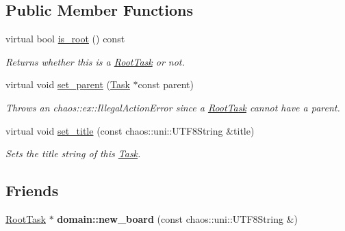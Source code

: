 \subsection*{Public Member Functions}
\begin{DoxyCompactItemize}
\item 
\hypertarget{classsigma_1_1core_1_1tasks_1_1_root_task_a121303d6c4380323fe54bc823ef11514}{}virtual bool \hyperlink{classsigma_1_1core_1_1tasks_1_1_root_task_a121303d6c4380323fe54bc823ef11514}{is\+\_\+root} () const \label{classsigma_1_1core_1_1tasks_1_1_root_task_a121303d6c4380323fe54bc823ef11514}

\begin{DoxyCompactList}\small\item\em Returns whether this is a \hyperlink{classsigma_1_1core_1_1tasks_1_1_root_task}{Root\+Task} or not. \end{DoxyCompactList}\item 
\hypertarget{classsigma_1_1core_1_1tasks_1_1_root_task_a4b9f9c86ba7a0e5b681479a444cd60b1}{}virtual void \hyperlink{classsigma_1_1core_1_1tasks_1_1_root_task_a4b9f9c86ba7a0e5b681479a444cd60b1}{set\+\_\+parent} (\hyperlink{classsigma_1_1core_1_1tasks_1_1_task}{Task} $\ast$const parent)\label{classsigma_1_1core_1_1tasks_1_1_root_task_a4b9f9c86ba7a0e5b681479a444cd60b1}

\begin{DoxyCompactList}\small\item\em Throws an chaos\+::ex\+::\+Illegal\+Action\+Error since a \hyperlink{classsigma_1_1core_1_1tasks_1_1_root_task}{Root\+Task} cannot have a parent. \end{DoxyCompactList}\item 
\hypertarget{classsigma_1_1core_1_1tasks_1_1_root_task_ad618706d088cbe4492402c6f2b2628e2}{}virtual void \hyperlink{classsigma_1_1core_1_1tasks_1_1_root_task_ad618706d088cbe4492402c6f2b2628e2}{set\+\_\+title} (const chaos\+::uni\+::\+U\+T\+F8\+String \&title)\label{classsigma_1_1core_1_1tasks_1_1_root_task_ad618706d088cbe4492402c6f2b2628e2}

\begin{DoxyCompactList}\small\item\em Sets the title string of this \hyperlink{classsigma_1_1core_1_1tasks_1_1_task}{Task}. \end{DoxyCompactList}\end{DoxyCompactItemize}
\subsection*{Friends}
\begin{DoxyCompactItemize}
\item 
\hypertarget{classsigma_1_1core_1_1tasks_1_1_root_task_abbeca6ea45fce024d5ee3def03a97132}{}\hyperlink{classsigma_1_1core_1_1tasks_1_1_root_task}{Root\+Task} $\ast$ {\bfseries domain\+::new\+\_\+board} (const chaos\+::uni\+::\+U\+T\+F8\+String \&)\label{classsigma_1_1core_1_1tasks_1_1_root_task_abbeca6ea45fce024d5ee3def03a97132}

\end{DoxyCompactItemize}
